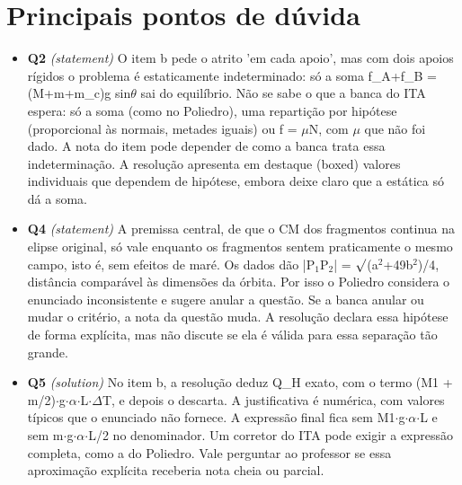 \documentclass{article}%
\begin{document}
\section*{Principais pontos de dúvida}%
\begin{itemize}%
\item%
\textbf{Q2} \textit{(statement)} O item b pede o atrito 'em cada apoio', mas com dois apoios rígidos o problema é estaticamente indeterminado: só a soma f\_A+f\_B = (M+m+m\_c)g sin$\theta$ sai do equilíbrio. Não se sabe o que a banca do ITA espera: só a soma (como no Poliedro), uma repartição por hipótese (proporcional às normais, metades iguais) ou f = $\mu$N, com $\mu$ que não foi dado. A nota do item pode depender de como a banca trata essa indeterminação. A resolução apresenta em destaque (boxed) valores individuais que dependem de hipótese, embora deixe claro que a estática só dá a soma.%
\item%
\textbf{Q4} \textit{(statement)} A premissa central, de que o CM dos fragmentos continua na elipse original, só vale enquanto os fragmentos sentem praticamente o mesmo campo, isto é, sem efeitos de maré. Os dados dão |P$_{1}$P$_{2}$| = $\surd$(a$^2$+49b$^2$)/4, distância comparável às dimensões da órbita. Por isso o Poliedro considera o enunciado inconsistente e sugere anular a questão. Se a banca anular ou mudar o critério, a nota da questão muda. A resolução declara essa hipótese de forma explícita, mas não discute se ela é válida para essa separação tão grande.%
\item%
\textbf{Q5} \textit{(solution)} No item b, a resolução deduz Q\_H exato, com o termo (M1 + m/2)$\cdot$g$\cdot$$\alpha$$\cdot$L$\cdot$$\Delta$T, e depois o descarta. A justificativa é numérica, com valores típicos que o enunciado não fornece. A expressão final fica sem M1$\cdot$g$\cdot$$\alpha$$\cdot$L e sem m$\cdot$g$\cdot$$\alpha$$\cdot$L/2 no denominador. Um corretor do ITA pode exigir a expressão completa, como a do Poliedro. Vale perguntar ao professor se essa aproximação explícita receberia nota cheia ou parcial.%
\end{itemize}%
\end{document}
